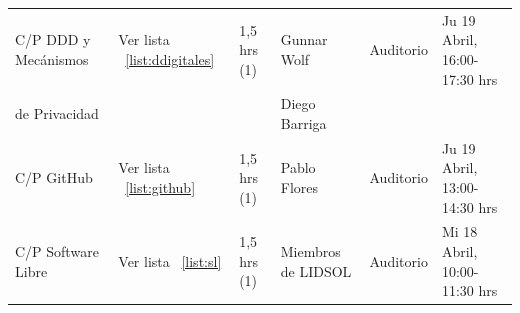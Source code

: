 \documentclass[a4paper,11pt]{article}                 %
\begin{document}
\begin{landscape}
\begin{table}[H]
\begin{tabular}{|l|l|l|l|l|l|}
C/P DDD y Mecánismos & Ver lista ~\ref{list:ddigitales} & 1,5 hrs (1) & Gunnar Wolf & Auditorio & Ju 19 Abril, 16:00-17:30 hrs \\ 
  de Privacidad  &  & &  Diego Barriga &  & \\  \hline
C/P GitHub & Ver lista ~\ref{list:github} & 1,5 hrs (1) & Pablo Flores & Auditorio & Ju 19 Abril, 13:00-14:30 hrs \\ \hline

C/P Software Libre & Ver lista ~\ref{list:sl} & 1,5 hrs (1) & Miembros de LIDSOL & Auditorio & Mi 18 Abril, 10:00-11:30 hrs \\  \hline

\end{tabular}
 
\end{table}
  
  
  \end{landscape}
  
\end{document}
